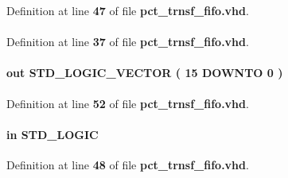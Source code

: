 Definition at line {\bf 47} of file {\bf pct\+\_\+trnsf\+\_\+fifo.\+vhd}.

\paragraph[{ieee}]{\hspace{0.3cm}{\ttfamily [Library]}}\label{classpct__trnsf__fifo_a0a6af6eef40212dbaf130d57ce711256}


Definition at line {\bf 37} of file {\bf pct\+\_\+trnsf\+\_\+fifo.\+vhd}.

\paragraph[{q}]{ {\bfseries \textcolor{keywordflow}{out}\textcolor{vhdlchar}{ }} {\bfseries \textcolor{comment}{S\+T\+D\+\_\+\+L\+O\+G\+I\+C\+\_\+\+V\+E\+C\+T\+OR}\textcolor{vhdlchar}{ }\textcolor{vhdlchar}{(}\textcolor{vhdlchar}{ }\textcolor{vhdlchar}{ } \textcolor{vhdldigit}{15} \textcolor{vhdlchar}{ }\textcolor{keywordflow}{D\+O\+W\+N\+TO}\textcolor{vhdlchar}{ }\textcolor{vhdlchar}{ } \textcolor{vhdldigit}{0} \textcolor{vhdlchar}{ }\textcolor{vhdlchar}{)}\textcolor{vhdlchar}{ }} \hspace{0.3cm}{\ttfamily [Port]}}\label{classpct__trnsf__fifo_ae9167976d765f207ce6ab5be80bdc3b0}


Definition at line {\bf 52} of file {\bf pct\+\_\+trnsf\+\_\+fifo.\+vhd}.

\paragraph[{rdclk}]{ {\bfseries \textcolor{keywordflow}{in}\textcolor{vhdlchar}{ }} {\bfseries \textcolor{comment}{S\+T\+D\+\_\+\+L\+O\+G\+IC}\textcolor{vhdlchar}{ }} \hspace{0.3cm}{\ttfamily [Port]}}\label{classpct__trnsf__fifo_a463d5fc49d1826e964692ab15a4459e5}


Definition at line {\bf 48} of file {\bf pct\+\_\+trnsf\+\_\+fifo.\+vhd}.

